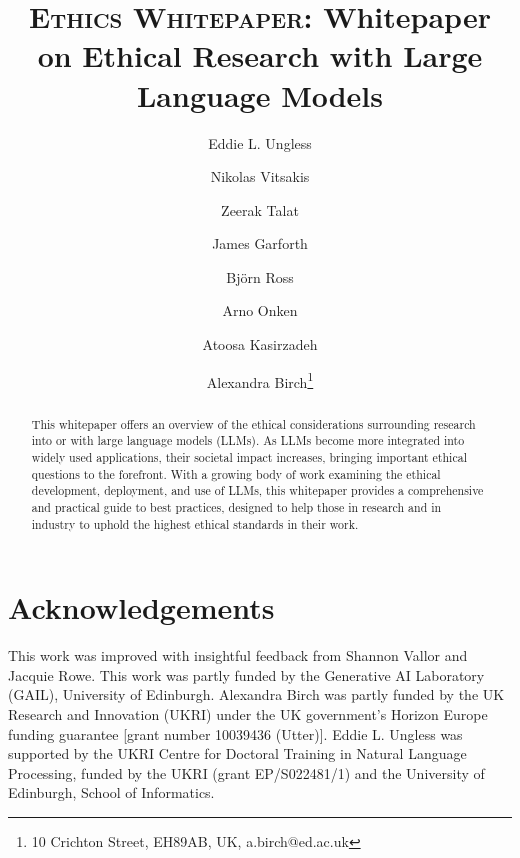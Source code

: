 \documentclass[sigconf,anonymous]{clv3}
\begin{document}
\title{\textsc{Ethics Whitepaper}: Whitepaper on Ethical Research with Large Language Models}

\author{Eddie L. Ungless}

\author{Nikolas Vitsakis}

\author{Zeerak Talat}

\author{James Garforth}

\author{Björn Ross}

\author{Arno Onken}

\author{Atoosa Kasirzadeh}

\author{Alexandra Birch\thanks{10 Crichton Street, EH89AB, UK, a.birch@ed.ac.uk}}



\maketitle

\begin{abstract}
This whitepaper offers an overview of the ethical considerations surrounding research into or with large language models (LLMs). As LLMs become more integrated into widely used applications, their societal impact increases, bringing important ethical questions to the forefront. With a growing body of work examining the ethical development, deployment, and use of LLMs, this whitepaper provides a comprehensive and practical guide to best practices, designed to help those in research and in industry to uphold the highest ethical standards in their work.

\end{abstract}












%

\section*{Acknowledgements}

This work was improved with insightful feedback from Shannon Vallor and Jacquie Rowe. This work was partly funded by the Generative AI Laboratory (GAIL), University of Edinburgh. Alexandra Birch was partly funded by the UK Research and Innovation (UKRI) under the UK government’s Horizon Europe funding guarantee [grant number 10039436 (Utter)]. Eddie L. Ungless was supported by the UKRI Centre for Doctoral Training in Natural Language Processing, funded by the UKRI (grant EP/S022481/1) and the University of Edinburgh, School of Informatics.






\appendix

\end{document}

